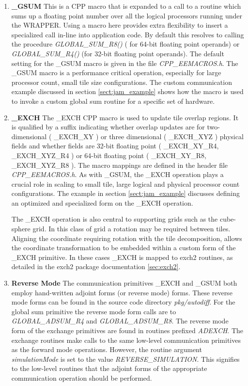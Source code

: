 \begin{enumerate}
\item {\bf \_GSUM}
  This is a CPP macro that is expanded to a call to a routine which
  sums up a floating point number over all the logical processors
  running under the WRAPPER. Using a macro here provides extra
  flexibility to insert a specialized call in-line into application
  code. By default this resolves to calling the procedure {\em
    GLOBAL\_SUM\_R8()} ( for 64-bit floating point operands) or {\em
    GLOBAL\_SUM\_R4()} (for 32-bit floating point operands). The
  default setting for the \_GSUM macro is given in the file {\em
    CPP\_EEMACROS.h}.  The \_GSUM macro is a performance critical
  operation, especially for large processor count, small tile size
  configurations.  The custom communication example discussed in
  section \ref{sect:jam_example} shows how the macro is used to invoke
  a custom global sum routine for a specific set of hardware.

\item {\bf \_EXCH}
  The \_EXCH CPP macro is used to update tile overlap regions.  It is
  qualified by a suffix indicating whether overlap updates are for
  two-dimensional ( \_EXCH\_XY ) or three dimensional ( \_EXCH\_XYZ )
  physical fields and whether fields are 32-bit floating point (
  \_EXCH\_XY\_R4, \_EXCH\_XYZ\_R4 ) or 64-bit floating point (
  \_EXCH\_XY\_R8, \_EXCH\_XYZ\_R8 ). The macro mappings are defined in
  the header file {\em CPP\_EEMACROS.h}. As with \_GSUM, the \_EXCH
  operation plays a crucial role in scaling to small tile, large
  logical and physical processor count configurations.  The example in
  section \ref{sect:jam_example} discusses defining an optimized and
  specialized form on the \_EXCH operation.

  The \_EXCH operation is also central to supporting grids such as the
  cube-sphere grid. In this class of grid a rotation may be required
  between tiles. Aligning the coordinate requiring rotation with the
  tile decomposition, allows the coordinate transformation to be
  embedded within a custom form of the \_EXCH primitive.  In these
  cases \_EXCH is mapped to exch2 routines, as detailed in the exch2
  package documentation \ref{sec:exch2}.

\item {\bf Reverse Mode}
  The communication primitives \_EXCH and \_GSUM both employ
  hand-written adjoint forms (or reverse mode) forms.  These reverse
  mode forms can be found in the source code directory {\em
    pkg/autodiff}.  For the global sum primitive the reverse mode form
  calls are to {\em GLOBAL\_ADSUM\_R4} and {\em GLOBAL\_ADSUM\_R8}.
  The reverse mode form of the exchange primitives are found in
  routines prefixed {\em ADEXCH}. The exchange routines make calls to
  the same low-level communication primitives as the forward mode
  operations. However, the routine argument {\em simulationMode} is
  set to the value {\em REVERSE\_SIMULATION}. This signifies to the
  low-level routines that the adjoint forms of the appropriate
  communication operation should be performed.


\end{enumerate}
